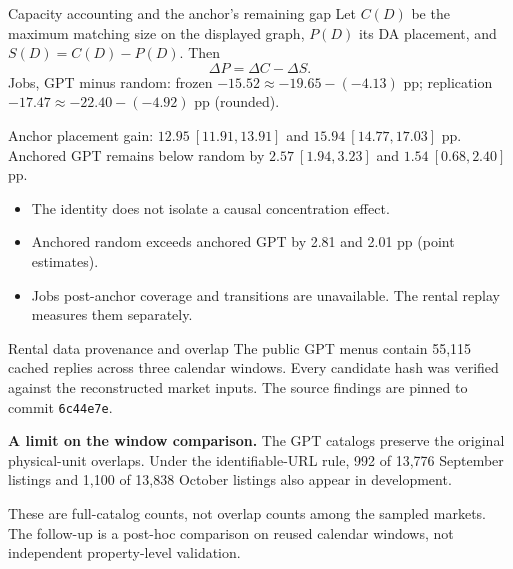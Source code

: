 \begin{frame}{Capacity accounting and the anchor's remaining gap}
\small
Let $C(D)$ be the maximum matching size on the displayed graph,
$P(D)$ its DA placement, and $S(D)=C(D)-P(D)$. Then
\[
\Delta P=\Delta C-\Delta S.
\]
Jobs, GPT minus random: frozen $-15.52\approx-19.65-(-4.13)$ pp;
replication $-17.47\approx-22.40-(-4.92)$ pp (rounded).

Anchor placement gain: $12.95\ [11.91,13.91]$ and
$15.94\ [14.77,17.03]$ pp.
Anchored GPT remains below random by $2.57\ [1.94,3.23]$ and
$1.54\ [0.68,2.40]$ pp.
\begin{itemize}
\item The identity does not isolate a causal concentration effect.
\item Anchored random exceeds anchored GPT by 2.81 and 2.01 pp (point estimates).
\item Jobs post-anchor coverage and transitions are unavailable. The rental replay measures them separately.
\end{itemize}
\end{frame}

\begin{frame}{Rental data provenance and overlap}
\small
The public GPT menus contain 55,115 cached replies across three calendar windows.
Every candidate hash was verified against the reconstructed market inputs.
The source findings are pinned to commit \texttt{6c44e7e}.

\medskip
\textbf{A limit on the window comparison.}
The GPT catalogs preserve the original physical-unit overlaps.
Under the identifiable-URL rule, 992 of 13,776 September listings and
1,100 of 13,838 October listings also appear in development.

\medskip
These are full-catalog counts, not overlap counts among the sampled markets.
The follow-up is a post-hoc comparison on reused calendar windows,
not independent property-level validation.
\end{frame}

